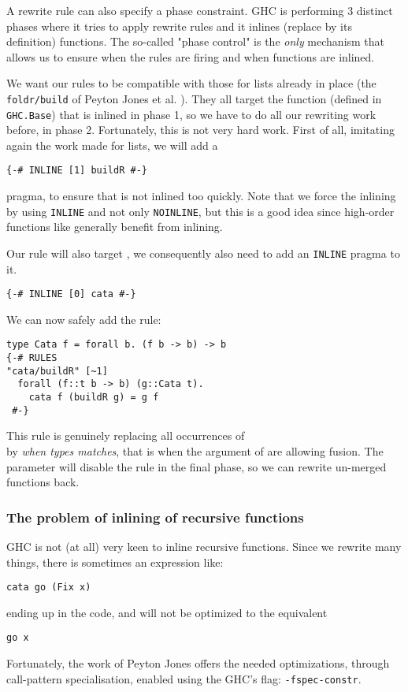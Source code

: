 A rewrite rule can also specify a phase constraint. GHC is performing 3 distinct phases where it tries to apply rewrite rules and it inlines (replace by its definition) functions. The so-called "phase control" is the \emph{only} mechanism that allows us to ensure when the rules are firing and when functions are inlined.

We want our rules to be compatible with those for lists already in place (the \verb|foldr/build| of Peyton Jones et al. \cite{pbr}). They all target the  function (defined in \verb|GHC.Base|) that is inlined in phase 1, so we have to do all our rewriting work before, in phase 2. Fortunately, this is not very hard work. First of all, imitating again the work made for lists, we will add a
\begin{verbatim}
{-# INLINE [1] buildR #-}
\end{verbatim}
pragma, to ensure that  is not inlined too quickly. Note that we force the inlining by using \verb|INLINE| and not only \verb|NOINLINE|, but this is a good idea since high-order functions like  generally benefit from inlining.

Our rule will also target , we consequently also need to add an \verb|INLINE| pragma to it.
\begin{verbatim}
{-# INLINE [0] cata #-}
\end{verbatim}

\noindent We can now safely add the rule:
\begin{verbatim}
type Cata f = forall b. (f b -> b) -> b
{-# RULES
"cata/buildR" [~1]
  forall (f::t b -> b) (g::Cata t).
    cata f (buildR g) = g f
 #-}
\end{verbatim}
This rule is genuinely replacing all occurrences of\\  by  \emph{when types matches}, that is when the argument of  are allowing fusion. The \hs{[~1]} parameter will disable the rule in the final phase, so we can rewrite un-merged functions back.

\subsubsection{The problem of inlining of recursive functions}
GHC is not (at all) very keen to inline recursive functions. Since we rewrite many things, there is sometimes an expression like:
\begin{verbatim}
cata go (Fix x)
\end{verbatim}
ending up in the code, and will not be optimized to the equivalent
\begin{verbatim}
go x
\end{verbatim}
Fortunately, the work of Peyton Jones \cite{PeytonJones:2007:CSH:1291151.1291200} offers the needed optimizations, through call-pattern specialisation, enabled using the GHC's flag: \verb|-fspec-constr|.

